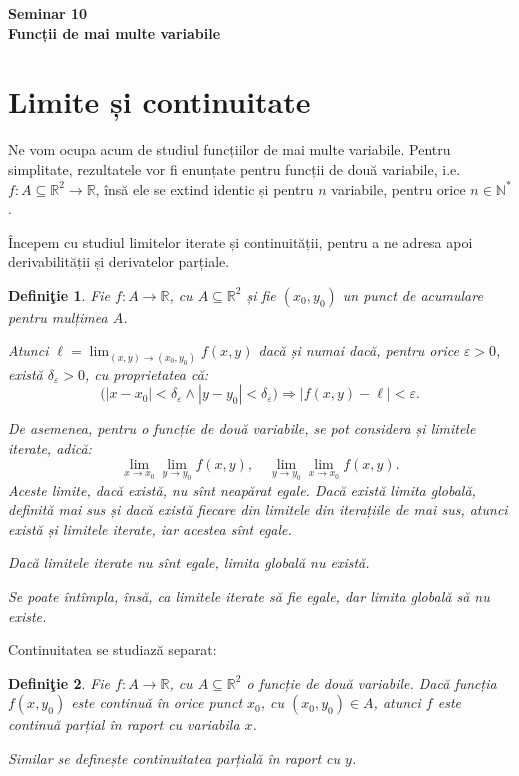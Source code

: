\documentclass[11pt,a4paper]{article}
\newcommand\ds{\displaystyle}
\newcommand\seq{\subseteq}
\newcommand\NN{\mathbb{N}}
\newcommand\RR{\mathbb{R}}
\theoremstyle{dotless}
\theoremstyle{dotlessdr}
\newtheorem{definition}{Defini\c{t}ie}[section]
\begin{document}
\begin{center}
  {\large\textbf{Seminar 10 \\ Funcții de mai multe variabile}}
\end{center}

\vspace{1cm}

\section{Limite și continuitate}
\label{sec:limite-cont}

Ne vom ocupa acum de studiul funcțiilor de mai multe variabile. Pentru simplitate,
rezultatele vor fi enunțate pentru funcții de două variabile, i.e.\
$f : A \seq \RR^2 \to \RR$, însă ele se extind identic și pentru $n$ variabile, pentru
orice $n \in \NN^\ast$.

Începem cu studiul limitelor iterate și continuității, pentru a ne adresa apoi
derivabilității și derivatelor parțiale.

\begin{definition}\label{def:lim-iter}
  Fie $f : A \to \RR$, cu $A \seq \RR^2$ și fie $(x_0, y_0)$ un punct de acumulare pentru
  mulțimea $A$.

  Atunci $\ell = \ds\lim_{(x, y) \to (x_0, y_0)} f(x, y)$ dacă și numai dacă, pentru orice
  $\varepsilon > 0$, există $\delta_\varepsilon > 0$, cu proprietatea că:
  \[
    \big( |x - x_0| < \delta_\varepsilon \land | y - y_0 | < \delta_\varepsilon \big) \Rightarrow %
    |f (x, y) - \ell | < \varepsilon.
  \]

  De asemenea, pentru o funcție de două variabile, se pot considera și \emph{limitele iterate},
  adică:
  \[
    \lim_{x \to x_0} \lim_{y \to y_0} f(x, y), \quad %
    \lim_{y \to y_0} \lim_{x \to x_0} f(x, y).
  \]
  Aceste limite, dacă există, nu sînt neapărat egale. Dacă există \emph{limita globală}, definită
  mai sus și dacă există fiecare din limitele din iterațiile de mai sus, atunci există și
  limitele iterate, iar acestea sînt egale.

  Dacă limitele iterate nu sînt egale, limita globală nu există.

  Se poate întîmpla, însă, ca limitele iterate să fie egale, dar limita globală să nu existe.
\end{definition}

Continuitatea se studiază separat:

\begin{definition}\label{def:cont-mm}
  Fie $f : A \to \RR$, cu $A \seq \RR^2$ o funcție de două variabile. Dacă funcția $f(x, y_0)$
  este continuă în orice punct $x_0$, cu $(x_0, y_0) \in A$, atunci $f$ este \emph{continuă parțial}
  în raport cu variabila $x$.

  Similar se definește continuitatea parțială în raport cu $y$.
\end{definition}
\end{document}
